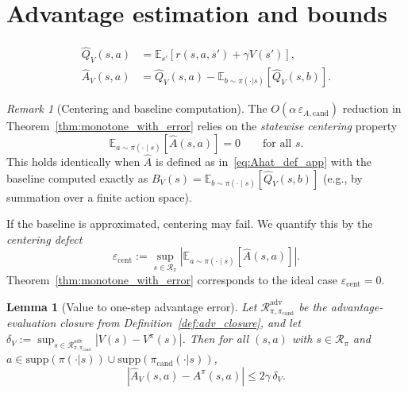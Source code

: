 \documentclass{article}
\theoremstyle{plain}
\newtheorem{lemma}[theorem]{Lemma}
\theoremstyle{definition}
\theoremstyle{remark}
\newtheorem{remark}[theorem]{Remark}
\newcommand{\E}{\mathbb{E}}
\begin{document}
\section{Advantage estimation and bounds}
\label{app:adv_bounds}

\begin{align}
\widehat Q_V(s,a) &= \E_{s'}[r(s,a,s') + \gamma V(s')], \\
\widehat A_V(s,a) &= \widehat Q_V(s,a) -
\E_{b\sim\pi(\cdot|s)}[\widehat Q_V(s,b)].
\label{eq:Ahat_def_app}
\end{align}

\begin{remark}[Centering and baseline computation]
\label{rem:baseline_app}
The $O(\alpha\,\varepsilon_{A,\mathrm{cand}})$ reduction in Theorem~\ref{thm:monotone_with_error}
relies on the \emph{statewise centering} property
\[
\E_{a\sim\pi(\cdot\mid s)}[\widehat A(s,a)] = 0 \qquad \text{for all } s.
\]
This holds identically when $\widehat A$ is defined as in~\eqref{eq:Ahat_def_app} with the baseline computed exactly as
$B_V(s)=\E_{b\sim\pi(\cdot\mid s)}[\widehat Q_V(s,b)]$ (e.g., by summation over a finite action space).

If the baseline is approximated, centering may fail. We quantify this by the \emph{centering defect}
\[
\varepsilon_{\mathrm{cent}}
:=
\sup_{s\in\mathcal{R}_\pi}\left|\E_{a\sim\pi(\cdot\mid s)}[\widehat A(s,a)]\right|.
\]
Theorem~\ref{thm:monotone_with_error} corresponds to the ideal case $\varepsilon_{\mathrm{cent}}=0$.
\end{remark}

\begin{lemma}[Value to one-step advantage error]
\label{lem:A_error_app}
Let $\mathcal{R}_{\pi,\pi_{\mathrm{cand}}}^{\mathrm{adv}}$ be the advantage-evaluation closure from Definition~\ref{def:adv_closure},
and let $\delta_V := \sup_{s\in \mathcal{R}_{\pi,\pi_{\mathrm{cand}}}^{\mathrm{adv}}} |V(s)-V^\pi(s)|$.
Then for all $(s,a)$ with $s\in\mathcal{R}_\pi$ and $a\in \mathrm{supp}(\pi(\cdot|s))\cup\mathrm{supp}(\pi_{\mathrm{cand}}(\cdot|s))$,
\[
|\widehat A_V(s,a) - A^\pi(s,a)| \le 2\gamma\,\delta_V.
\]
\end{lemma}
\end{document}

